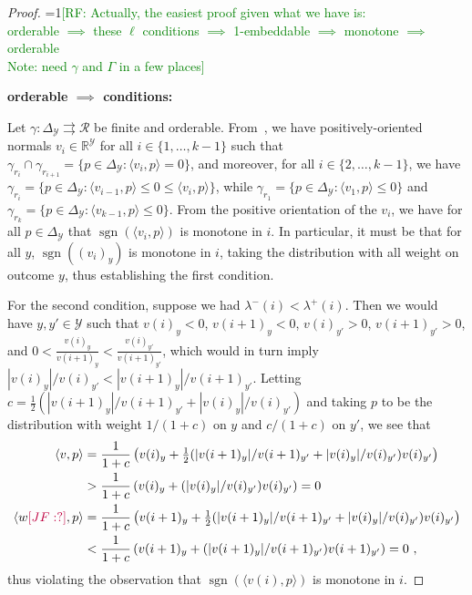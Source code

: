 \documentclass[anon]{colt2020} %
\newcommand{\Comments}{1}
\newcommand{\mynote}[2]{\ifnum\Comments=1\textcolor{#1}{#2}\fi}
\newcommand{\mytodo}[2]{\ifnum\Comments=1%
	\todo[linecolor=#1!80!black,backgroundcolor=#1,bordercolor=#1!80!black]{#2}\fi}
\newcommand{\raf}[1]{\mynote{green}{[RF: #1]}}
\newcommand{\raft}[1]{\mytodo{green!20!white}{RF: #1}}
\newcommand{\jessie}[1]{\mynote{purple}{[JF: #1]}}
\newcommand{\reals}{\mathbb{R}}
\newcommand{\simplex}{\Delta_\Y}
\newcommand{\R}{\mathcal{R}}
\newcommand{\Y}{\mathcal{Y}}
\newcommand{\inprod}[2]{\langle #1, #2 \rangle}%
\newcommand{\toto}{\rightrightarrows}
\newcommand{\ones}{\mathbbm{1}}
\DeclareMathOperator*{\sgn}{sgn}
\begin{document}
\begin{proof}
  \raf{Actually, the easiest proof given what we have is:
    \\
  orderable
  $\implies$
  these $\ell$ conditions
  $\implies$
  1-embeddable
  $\implies$
  monotone
  $\implies$
  orderable
  \\
  Note: need $\gamma$ and $\Gamma$ in a few places}

  \noindent\textbf{orderable $\implies$ conditions:}

  Let $\gamma:\simplex\toto\R$ be finite and orderable.
  From~\cite[Theorem 4]{lambert2018elicitation}, we have positively-oriented normals $v_i\in\reals^\Y$ for all $i \in \{1,\ldots,k-1\}$ such that $\gamma_{r_i} \cap \gamma_{r_{i+1}} = \{p\in\simplex : \inprod{v_i}{p} = 0\}$, and moreover, for all $i \in \{2,\ldots,k-1\}$, we have $\gamma_{r_i} = \{p\in\simplex : \inprod{v_{i-1}}{p} \leq 0 \leq \inprod{v_i}{p}\}$, while $\gamma_{r_1} = \{p\in\simplex : \inprod{v_1}{p} \leq 0\}$ and $\gamma_{r_k} = \{p\in\simplex : \inprod{v_{k-1}}{p} \leq 0\}$.
  From the positive orientation of the $v_i$, we have for all $p\in\simplex$ that $\sgn(\inprod{v_i}{p})$ is monotone in $i$.
  In particular, it must be that for all $y$, $\sgn((v_i)_y)$ is monotone in $i$, taking the distribution with all weight on outcome $y$, thus establishing the first condition.

  For the second condition, suppose we had $\lambda^-(i) < \lambda^+(i)$.
  Then we would have $y,y' \in \Y$ such that $v(i)_y < 0$, $v({i+1})_y < 0$, $v(i)_{y'} >0$, $v({i+1})_{y'} > 0$, and $0 < \frac{v(i)_y}{v({i+1})_y} < \frac{v(i)_{y'}}{v({i+1})_{y'}}$, which would in turn imply $|v(i)_y|/v(i)_{y'} < |v(i+1)_y| / v(i+1)_{y'}$.
  Letting $c = \tfrac 1 2 \left(|v(i+1)_y| / v(i+1)_{y'} + |v(i)_y|/v(i)_{y'}\right)$ and taking $p$ to be the distribution with weight $1/(1+c)$ on $y$ and $c/(1+c)$ on $y'$, we see that
  \begin{align*}
    \inprod{v}{p} &= \frac 1 {1+c} \left(v(i)_y + \tfrac 1 2 (|v(i+1)_y| / v(i+1)_{y'} + |v(i)_y|/v(i)_{y'})v(i)_{y'}\right)
    \\ &> \frac 1 {1+c} \left(v(i)_y + (|v(i)_y|/v(i)_{y'})v(i)_{y'}\right) = 0
    \\
    \inprod{w\jessie{?}}{p} &= \frac 1 {1+c} \left(v(i+1)_y + \tfrac 1 2 (|v(i+1)_y| / v(i+1)_{y'} + |v(i)_y|/v(i)_{y'})v(i)_{y'}\right)
    \\ &< \frac 1 {1+c} \left(v(i+1)_y + (|v(i+1)_y|/v(i+1)_{y'})v(i+1)_{y'}\right) = 0~,
  \end{align*}
  thus violating the observation that $\sgn(\inprod{v(i)}{p})$ is monotone in $i$.


\end{proof}
\end{document}
